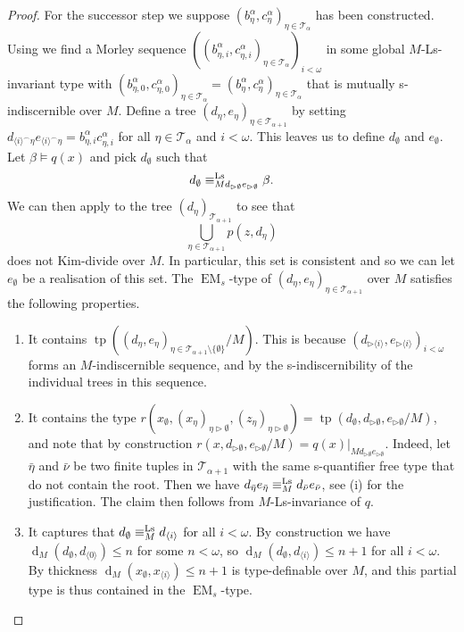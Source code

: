 \documentclass[a4paper, reqno]{amsart}
\theoremstyle{definition}
\theoremstyle{repeat}
\newcommand{\T}{\mathcal{T}}
\DeclareMathOperator{\tp}{tp}
\renewcommand{\d}{\operatorname{d}}
\DeclareMathOperator{\EM}{EM}
\newcommand{\equivls}{\equiv^\textup{Ls}}
\begin{document}
\begin{proof}
For the successor step we suppose $(b^\alpha_\eta, c^\alpha_\eta)_{\eta \in \T_\alpha}$ has been constructed. Using  we find a Morley sequence $((b^\alpha_{\eta,i}, c^\alpha_{\eta,i})_{\eta \in \T_\alpha})_{i < \omega}$ in some global $M$-Ls-invariant type with $(b^\alpha_{\eta,0}, c^\alpha_{\eta,0})_{\eta \in \T_\alpha} = (b^\alpha_\eta, c^\alpha_\eta)_{\eta \in \T_\alpha}$ that is mutually s-indiscernible over $M$. Define a tree $(d_\eta, e_\eta)_{\eta \in \T_{\alpha+1}}$ by setting $d_{\langle i \rangle^\frown \eta} e_{\langle i \rangle^\frown \eta} = b^\alpha_{\eta,i} c^\alpha_{\eta,i}$ for all $\eta \in \T_\alpha$ and $i < \omega$. This leaves us to define $d_\emptyset$ and $e_\emptyset$. Let $\beta \models q(x)$ and pick $d_\emptyset$ such that
\[
d_\emptyset \equivls_{M d_{\rhd \emptyset} e_{\rhd \emptyset}} \beta.
\]
We can then apply  to the tree $(d_\eta)_{\T_{\alpha+1}}$ to see that
\[
\bigcup_{\eta \in \T_{\alpha+1}} p(z, d_\eta)
\]
does not Kim-divide over $M$. In particular, this set is consistent and so we can let $e_\emptyset$ be a realisation of this set. The $\EM_s$-type of $(d_\eta, e_\eta)_{\eta \in \T_{\alpha+1}}$ over $M$ satisfies the following properties.
\begin{enumerate}[label=(\roman*)]
\item It contains $\tp((d_\eta, e_\eta)_{\eta \in \T_{\alpha+1} \setminus \{\emptyset\}}/M)$. This is because $(d_{\rhd \langle i \rangle}, e_{\rhd \langle i \rangle})_{i < \omega}$ forms an $M$-indiscernible sequence, and by the s-indiscernibility of the individual trees in this sequence.
\item It contains the type $r(x_\emptyset, (x_\eta)_{\eta \rhd \emptyset}, (z_\eta)_{\eta \rhd \emptyset}) = \tp(d_\emptyset, d_{\rhd \emptyset}, e_{\rhd \emptyset}/M)$, and note that by construction $r(x, d_{\rhd \emptyset}, e_{\rhd \emptyset}/M) = q(x)|_{M d_{\rhd \emptyset} e_{\rhd \emptyset}}$. Indeed, let $\bar{\eta}$ and $\bar{\nu}$ be two finite tuples in $\T_{\alpha+1}$ with the same s-quantifier free type that do not contain the root. Then we have $d_{\bar{\eta}} e_{\bar{\eta}} \equivls_M d_{\bar{\nu}} e_{\bar{\nu}}$, see (i) for the justification. The claim then follows from $M$-Ls-invariance of $q$.
\item It captures that $d_\emptyset \equivls_M d_{\langle i \rangle}$ for all $i < \omega$. By construction we have $\d_M(d_\emptyset, d_{\langle 0 \rangle}) \leq n$ for some $n < \omega$, so $\d_M(d_\emptyset, d_{\langle i \rangle}) \leq n + 1$ for all $i < \omega$. By thickness $\d_M(x_\emptyset, x_{\langle i \rangle}) \leq n + 1$ is type-definable over $M$, and this partial type is thus contained in the $\EM_s$-type.

\end{enumerate}
\end{proof}
\end{document}
